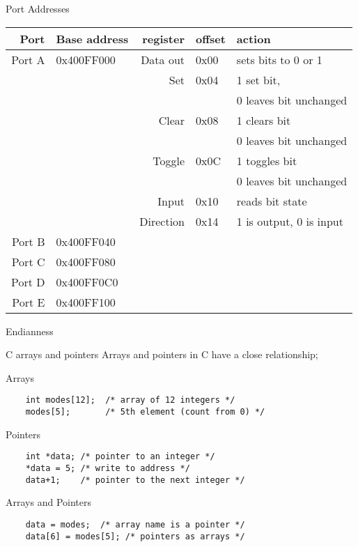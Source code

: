 \documentclass[xcolor=svgnames]{beamer}
\begin{document}
\begin{frame}{Port Addresses}
\begin{tabular}{rlrll}
    Port & Base address & register & offset & action\\\toprule
    Port A & 0x400FF000 & Data out & 0x00 & sets bits to 0 or 1\\
                    &&    Set      & 0x04 & 1 set bit,\\
                    &&&& 0 leaves bit unchanged \\
                    &&    Clear    & 0x08 & 1 clears bit \\
                    &&&& 0 leaves bit unchanged \\
                    &&    Toggle   & 0x0C & 1 toggles bit \\
                    &&&& 0 leaves bit unchanged \\
                    &&    Input    & 0x10 & reads bit state\\
                    &&   Direction & 0x14 & 1 is output, 0 is input \\\midrule
    Port B & 0x400FF040\\
    Port C & 0x400FF080\\
    Port D & 0x400FF0C0\\
    Port E & 0x400FF100\\
    \end{tabular}
\end{frame}

\begin{frame}{Endianness}

\end{frame}

\begin{frame}[fragile]{C arrays and pointers}
Arrays and pointers in C have a close relationship;
\begin{exampleblock}{Arrays}
\begin{verbatim}
    int modes[12];  /* array of 12 integers */
    modes[5];       /* 5th element (count from 0) */
\end{verbatim}
\end{exampleblock}
\begin{exampleblock}{Pointers}
\begin{verbatim}
    int *data; /* pointer to an integer */
    *data = 5; /* write to address */
    data+1;    /* pointer to the next integer */
\end{verbatim}
\end{exampleblock}
\begin{exampleblock}{Arrays and Pointers}
\begin{verbatim}
    data = modes;  /* array name is a pointer */
    data[6] = modes[5]; /* pointers as arrays */
\end{verbatim}
\end{exampleblock}
\end{frame}
\end{document}
